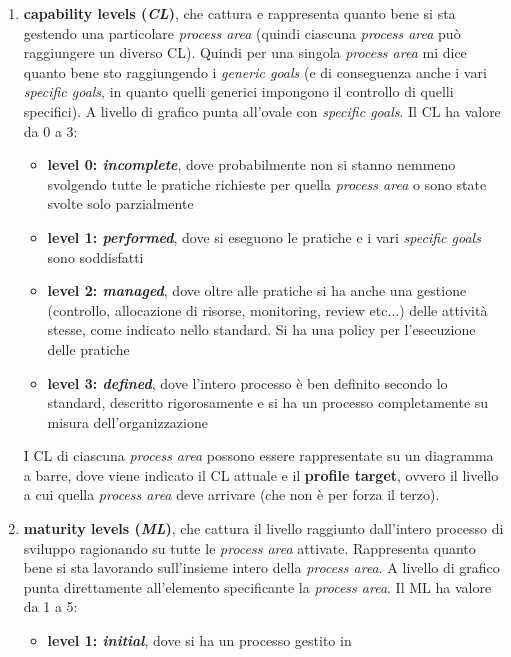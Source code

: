 \documentclass[a4paper,12pt, oneside]{book}
\begin{document}
\begin{enumerate}
  \item \textbf{capability levels (\textit{CL})}, che cattura e rappresenta
  quanto bene si sta gestendo una particolare \textit{process area} (quindi
  ciascuna \textit{process area} può raggiungere un diverso CL). Quindi per una
  singola \textit{process area} mi dice quanto bene sto raggiungendo i
  \textit{generic goals} (e di conseguenza anche i vari \textit{specific
    goals}, in quanto quelli generici impongono il controllo di quelli
  specifici). A livello di grafico punta all'ovale con \textit{specific goals}.
  Il CL ha valore da 0 a 3:
  \begin{itemize}
    \item \textbf{level 0: \textit{incomplete}}, dove probabilmente non si
    stanno nemmeno svolgendo tutte le pratiche richieste per quella
    \textit{process area} o sono state svolte solo parzialmente
    \item \textbf{level 1: \textit{performed}}, dove si eseguono le pratiche e i
    vari \textit{specific goals} sono soddisfatti
    \item \textbf{level 2: \textit{managed}}, dove oltre alle pratiche si ha
    anche una gestione (controllo, allocazione di risorse, monitoring, review
    etc$\ldots$) delle attività stesse, come indicato nello standard. Si ha una
    policy per l'esecuzione delle pratiche 
    \item \textbf{level 3: \textit{defined}}, dove l'intero processo è ben
    definito secondo lo standard, descritto rigorosamente e si ha un processo
    completamente su misura dell'organizzazione 
  \end{itemize}
  I CL di ciascuna \textit{process area} possono essere rappresentate su un
  diagramma a barre, dove viene indicato il CL attuale e il \textbf{profile
    target}, ovvero il livello a cui quella \textit{process area} deve
  arrivare (che non è per forza il terzo).
  \item \textbf{maturity levels (\textit{ML})}, che cattura il livello raggiunto
  dall'intero processo di sviluppo ragionando su tutte le \textit{process area}
  attivate. Rappresenta quanto bene si sta lavorando sull'insieme intero della
  \textit{process area}. A livello di grafico punta direttamente all'elemento
  specificante la \textit{process area}. Il ML ha valore da 1 a 5:
    \begin{itemize}
    \item \textbf{level 1: \textit{initial}}, dove si ha un processo gestito in

\end{itemize}
\end{enumerate}
\end{document}
